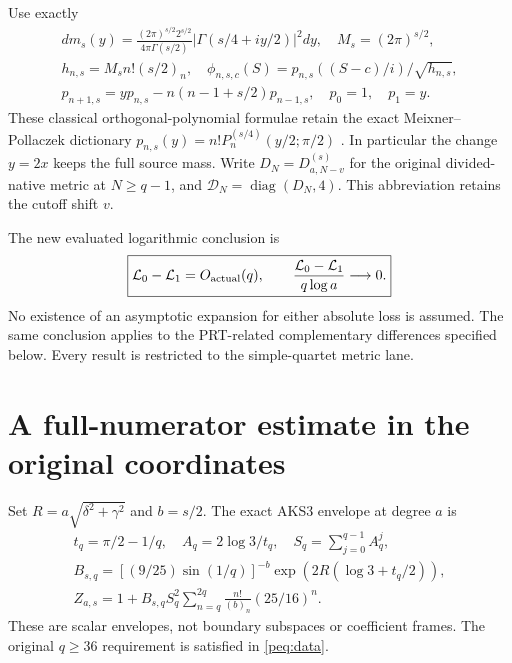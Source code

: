 \documentclass[11pt,a4paper]{article}
\DeclareMathOperator{\diag}{diag}
\begin{document}
Use exactly
\begin{equation}
\begin{gathered}
 dm_s(y)=\frac{(2\pi)^{s/2}2^{s/2}}{4\pi\Gamma(s/2)}
 |\Gamma(s/4+iy/2)|^2dy,\quad M_s=(2\pi)^{s/2},\\
 h_{n,s}=M_sn!(s/2)_n,\quad
 \phi_{n,s,c}(S)=p_{n,s}((S-c)/i)/\sqrt{h_{n,s}},\\
 p_{n+1,s}=yp_{n,s}-n(n-1+s/2)p_{n-1,s},\quad p_0=1,\quad p_1=y.
\end{gathered}\label{peq:gamma}
\end{equation}
These classical orthogonal-polynomial formulae retain the exact
Meixner--Pollaczek dictionary
$p_{n,s}(y)=n!P_n^{(s/4)}(y/2;\pi/2)$
\cite[eqs.~(18.19.8)--(18.19.9), (18.23.7)]{human:dlmf18}.
In particular the change $y=2x$ keeps the full source mass.
Write $D_N=D_{a,N-v}^{(s)}$ for the original divided-native metric at $N\ge q-1$, and $\mathcal D_N=\diag(D_N,4)$. This abbreviation retains the cutoff shift $v$.

The new evaluated logarithmic conclusion is
\begin{equation}
 \boxed{\mathcal L_0-\mathcal L_1=O_{\rm actual}(q),\qquad
 \frac{\mathcal L_0-\mathcal L_1}{q\log a}\longrightarrow0.}
 \label{peq:main}
\end{equation}
No existence of an asymptotic expansion for either absolute loss is assumed. The same conclusion applies to the PRT-related complementary differences specified below. Every result is restricted to the simple-quartet metric lane.

\section{A full-numerator estimate in the original coordinates}
Set $R=a\sqrt{\delta^2+\gamma^2}$ and $b=s/2$. The exact AKS3 envelope at degree $a$ is
\begin{equation}
\begin{gathered}
 t_q=\pi/2-1/q,\quad A_q=2\log3/t_q,\quad
 S_q=\sum_{j=0}^{q-1}A_q^j,\\
 B_{s,q}=[(9/25)\sin(1/q)]^{-b}
              \exp(2R(\log3+t_q/2)),\\
 Z_{a,s}=1+B_{s,q}S_q^2\sum_{n=q}^{2q}
                \frac{n!}{(b)_n}(25/16)^n.
\end{gathered}\label{peq:Z}
\end{equation}
These are scalar envelopes, not boundary subspaces or coefficient frames. The original $q\ge36$ requirement is satisfied in \eqref{peq:data}.
\end{document}
